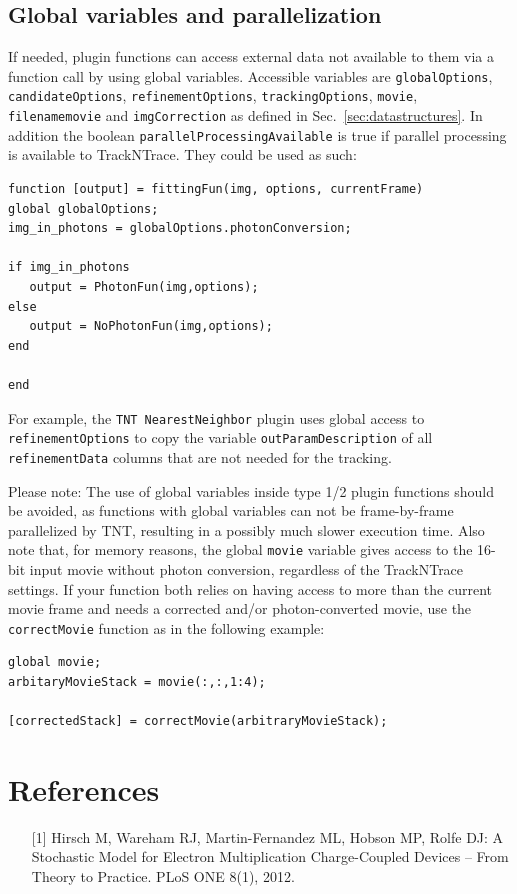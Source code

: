 \documentclass[11pt,onside]{report}
\numberwithin{equation}{chapter}
\begin{document}
\subsection{Global variables and parallelization}
If needed, plugin functions can access external data not available to them via a function call by using global variables. Accessible variables are  \texttt{globalOptions}, \texttt{candidateOptions}, \texttt{refinementOptions}, \texttt{trackingOptions}, \texttt{movie}, \texttt{filename\textunderscore movie} and \texttt{imgCorrection} as defined in Sec.~\ref{sec:datastructures}. In addition the boolean \texttt{parallelProcessingAvailable} is true if parallel processing is available to TrackNTrace. They could be used as such:
\begin{lstlisting}[style=Matlab-editor]
function [output] = fittingFun(img, options, currentFrame)
global globalOptions;
img_in_photons = globalOptions.photonConversion;

if img_in_photons
   output = PhotonFun(img,options);
else
   output = NoPhotonFun(img,options);
end

end
\end{lstlisting}
For example, the \texttt{TNT NearestNeighbor} plugin uses global access to \texttt{refinementOptions} to copy the variable \texttt{outParamDescription} of all \texttt{refinementData} columns that are not needed for the tracking. 

Please note: The use of global variables inside type 1/2 plugin functions should be avoided, as functions with global variables can not be frame-by-frame parallelized by TNT, resulting in a possibly much slower execution time. Also note that, for memory reasons, the global \texttt{movie} variable gives access to the 16-bit input movie without photon conversion, regardless of the TrackNTrace settings. If your function both relies on having access to more than the current movie frame and needs a corrected and/or photon-converted movie, use the \texttt{correctMovie} function as in the following example:
\begin{lstlisting}[style=Matlab-editor]
global movie;
arbitaryMovieStack = movie(:,:,1:4);

[correctedStack] = correctMovie(arbitraryMovieStack);
\end{lstlisting}

\clearpage

\section{References}
\begin{itemize}
\item [{[1]}]  Hirsch M, Wareham RJ, Martin-Fernandez ML, Hobson MP, Rolfe DJ: A Stochastic Model for Electron Multiplication Charge-Coupled Devices {--} From Theory to Practice. PLoS ONE 8(1), 2012.
\end{itemize}
\end{document}
